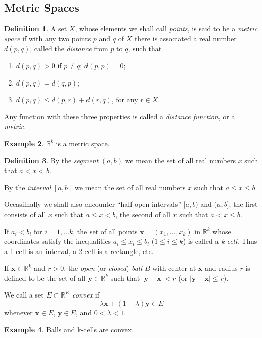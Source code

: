 \documentclass[11pt]{article}
\theoremstyle{definition}
\newtheorem{definition}{Definition}[section]
\newtheorem{example}[definition]{Example}
\theoremstyle{plain}
\theoremstyle{remark}
\newcommand{\R}{\mathbb{R}}
\begin{document}
\subsection{Metric Spaces}
\begin{definition}
A set $X$, whose elements we shall call \emph{points}, is said to be a \emph{metric space} if with any two points $p$ and $q$ of $X$ there is associated a real number $d(p,q)$, called the \emph{distance} from $p$ to $q$, such that
\begin{enumerate}
    \item[(a)] $d(p,q)>0$ if $p \neq q$; $d(p,p)=0$;
    \item[(b)] $d(p,q)=d(q,p)$;
    \item[(c)] $d(p,q) \leq d(p,r)+d(r,q)$, for any $r \in X$.  
\end{enumerate}

Any function with these three properties is called a \emph{distance function}, or a \emph{metric}.
\end{definition}
\begin{example}
$\R^k$ is a metric space.
\end{example}
\begin{definition}
By the \emph{segment} $(a,b)$ we mean the set of all real numbers $x$ such that $a<x<b$.

By the \emph{interval} $[a,b]$ we mean the set of all real numbers $x$ such that $a \leq x \leq b$.

Occasilnally we shall also encounter ``half-open intervals'' $[a,b)$ and $(a,b]$; the first consists of all $x$ such that $a \leq x < b$, the second of all $x$ such that $a < x \leq b$.

If $a_i<b_i$ for $i=1, \ldots k$, the set of all points $\mathbf{x}=(x_1, \dots , x_k)$ in $\R^k$ whose coordinates satisfy the inequalities $a_i \leq x_i \leq b_i$ ($1 \leq i \leq k$) is called a \emph{k-cell}.
Thus a 1-cell is an interval, a 2-cell is a rectangle, etc.

If $\mathbf{x} \in \R^k$ and $r>0$, the \emph{open} (or \emph{closed}) \emph{ball} $B$ with center at $\mathbf{x}$ and radius $r$ is defined to be the set of all $\mathbf{y} \in \R^k$ such that $|\mathbf{y}-\mathbf{x}|<r$ (or $|\mathbf{y}-\mathbf{x}| \leq r$).

We call a set $E \subset \R^K$ \emph{convex} if
\[
\lambda\mathbf{x}+(1-\lambda)\mathbf{y} \in E
\]
whenever $\mathbf{x} \in E$, $\mathbf{y} \in E$, and $0<\lambda<1$.
\end{definition}
\begin{example}
Balls and k-cells are convex.
\end{example}
\end{document}
